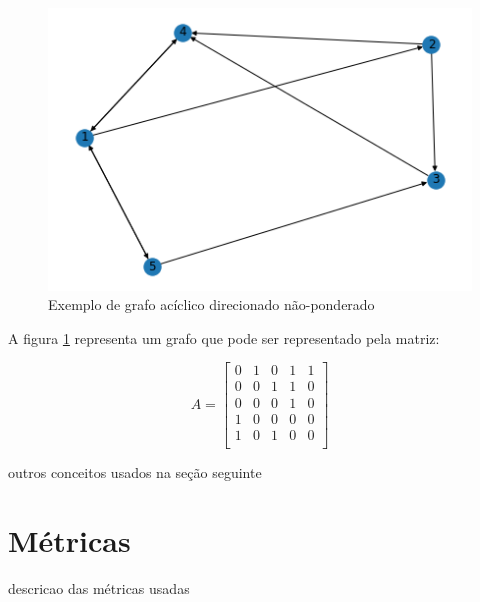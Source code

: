 \begin{figure}[htb]
 \caption{Exemplo de grafo acíclico direcionado não-ponderado}
 \label{fig:redes1:grafo-exemplo}
 \centering
 \includegraphics[scale=0.7]{images/redes-1-grafo-exemplo.png}
 \fautor
\end{figure}

A figura \ref{fig:redes1:grafo-exemplo} representa um grafo que pode ser representado pela matriz:

\begin{equation}
A = \begin{bmatrix}
0 & 1 & 0 & 1 & 1 \\
0 & 0 & 1 & 1 & 0 \\
0 & 0 & 0 & 1 & 0 \\
1 & 0 & 0 & 0 & 0 \\
1 & 0 & 1 & 0 & 0 \\
\end{bmatrix}
\end{equation}

outros conceitos usados na seção seguinte

\section{Métricas}

descricao das métricas usadas
